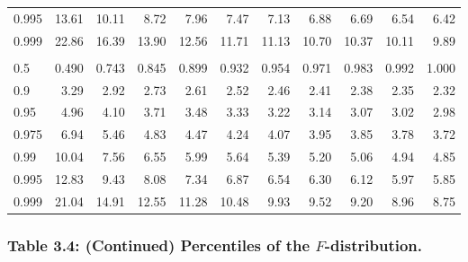 \documentclass[]{article}
\begin{document}
\begin{table}[H]
\begin{tabular}{lrrrrrrrrrr}
\hspace{1em}0.995 & 13.61 & 10.11 & 8.72 & 7.96 & 7.47 & 7.13 & 6.88 & 6.69 & 6.54 & 6.42\\
\hspace{1em}0.999 & 22.86 & 16.39 & 13.90 & 12.56 & 11.71 & 11.13 & 10.70 & 10.37 & 10.11 & 9.89\\
\addlinespace[0.3em]
\multicolumn{11}{l}{\textbf{$k_2=10$}}\\
\hspace{1em}0.5 & 0.490 & 0.743 & 0.845 & 0.899 & 0.932 & 0.954 & 0.971 & 0.983 & 0.992 & 1.000\\
\hspace{1em}0.9 & 3.29 & 2.92 & 2.73 & 2.61 & 2.52 & 2.46 & 2.41 & 2.38 & 2.35 & 2.32\\
\hspace{1em}0.95 & 4.96 & 4.10 & 3.71 & 3.48 & 3.33 & 3.22 & 3.14 & 3.07 & 3.02 & 2.98\\
\hspace{1em}0.975 & 6.94 & 5.46 & 4.83 & 4.47 & 4.24 & 4.07 & 3.95 & 3.85 & 3.78 & 3.72\\
\hspace{1em}0.99 & 10.04 & 7.56 & 6.55 & 5.99 & 5.64 & 5.39 & 5.20 & 5.06 & 4.94 & 4.85\\
\hspace{1em}0.995 & 12.83 & 9.43 & 8.08 & 7.34 & 6.87 & 6.54 & 6.30 & 6.12 & 5.97 & 5.85\\
\hspace{1em}0.999 & 21.04 & 14.91 & 12.55 & 11.28 & 10.48 & 9.93 & 9.52 & 9.20 & 8.96 & 8.75\\
\bottomrule
\end{tabular}
\end{table}

\hypertarget{table-3.4-continued-percentiles-of-the-f-distribution.}{%
\subsubsection{\texorpdfstring{Table 3.4: (Continued) Percentiles of the
\(F\)-distribution.}{Table 3.4: (Continued) Percentiles of the F-distribution.}}\label{table-3.4-continued-percentiles-of-the-f-distribution.}}
\end{document}
